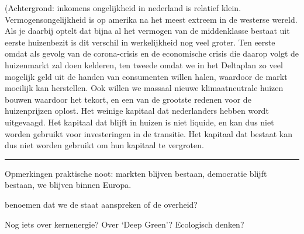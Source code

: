 (Achtergrond: inkomens ongelijkheid in nederland is relatief klein. Vermogensongelijkheid is op amerika na het meest extreem in de westerse wereld. Als je daarbij optelt dat bijna al het vermogen van de middenklasse bestaat uit eerste huizenbezit is dit verschil in werkelijkheid nog veel groter. Ten eerste omdat als gevolg van de corona-crisis en de economische crisis die daarop volgt de huizenmarkt zal doen kelderen, ten tweede omdat we in het Deltaplan zo veel mogelijk geld uit de handen van consumenten willen halen, waardoor de markt moeilijk kan herstellen. Ook willen we massaal nieuwe klimaatneutrale huizen bouwen waardoor het tekort, en een van de grootste redenen voor de huizenprijzen oplost. Het weinige kapitaal dat nederlanders hebben wordt uitgevaagd. Het kapitaal dat blijft in huizen is niet liquide, en kan dus niet worden gebruikt voor investeringen in de transitie. Het kapitaal dat bestaat kan dus niet worden gebruikt om hun kapitaal te vergroten. 

\hrule

Opmerkingen
praktische noot: markten blijven bestaan, democratie blijft bestaan, we blijven binnen Europa.

benoemen dat we de staat aanspreken of de overheid?

Nog iets over kernenergie? Over ‘Deep Green’? Ecologisch denken?
